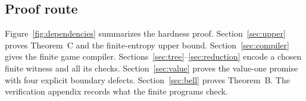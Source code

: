 \subsection{Proof route}
Figure~\ref{fig:dependencies} summarizes the hardness proof. Section~\ref{sec:upper} proves Theorem~C and the finite-entropy upper bound. Section~\ref{sec:compiler} gives the finite game compiler. Sections~\ref{sec:tree}--\ref{sec:reduction} encode a chosen finite witness and all its checks. Section~\ref{sec:value} proves the value-one promise with four explicit boundary defects. Section~\ref{sec:bell} proves Theorem~B. The verification appendix records what the finite programs check.

